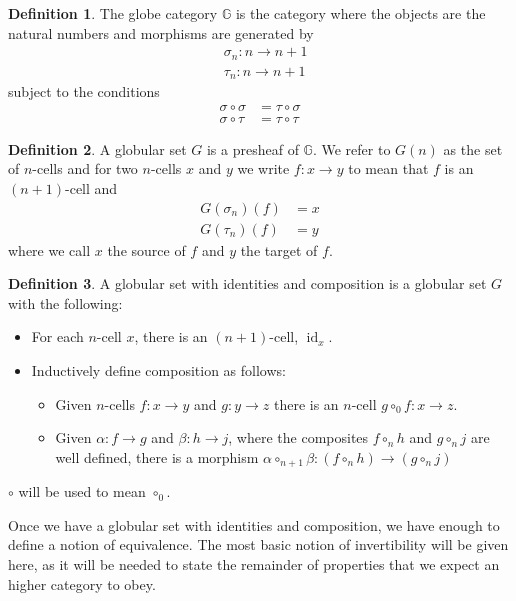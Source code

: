 \documentclass{article}
\theoremstyle{definition}
\newtheorem{definition}{Definition}
\theoremstyle{examplestyle}
\DeclareMathOperator{\id}{id}
\begin{document}
\begin{definition}
  The globe category \(\mathbb{G}\) is the category where the objects are the natural numbers and morphisms are generated by
  \begin{align*}
    &\sigma_n : n \to n+1\\
    &\tau_n : n \to n+1
  \end{align*}
  subject to the conditions
  \begin{align*}
    \sigma \circ \sigma &= \tau \circ \sigma\\
    \sigma \circ \tau &= \tau \circ \tau
  \end{align*}
\end{definition}

\begin{definition}
  A globular set \(G\) is a presheaf of \(\mathbb{G}\). We refer to \(G(n)\) as the set of \(n\)-cells and for two \(n\)-cells \(x\) and \(y\) we write \(f: x \to y\) to mean that \(f\) is an \((n+1)\)-cell and
  \begin{align*}
    G(\sigma_n)(f) &= x\\
    G(\tau_n)(f) &= y
  \end{align*}
  where we call \(x\) the source of \(f\) and \(y\) the target of \(f\).
\end{definition}

\begin{definition}
  A globular set with identities and composition is a globular set \(G\) with the following:
  \begin{itemize}
  \item For each \(n\)-cell \(x\), there is an \((n+1)\)-cell, \(\id_x\).
  \item Inductively define composition as follows:
    \begin{itemize}
    \item Given \(n\)-cells \(f: x \to y\) and \(g: y \to z\) there is
      an \(n\)-cell \(g \circ_0 f: x \to z\).
    \item Given \(\alpha: f \to g\) and \(\beta: h \to j\), where the composites \(f \circ_n h\) and \(g \circ_n j\) are well defined, there is a morphism \(\alpha \circ_{n+1} \beta: (f \circ_n h) \to (g \circ_n j)\)
    \end{itemize}
  \end{itemize}
  \(\circ\) will be used to mean \(\circ_0\).
\end{definition}

Once we have a globular set with identities and composition, we have enough to define a notion of equivalence. The most basic notion of invertibility will be given here, as it will be needed to state the remainder of properties that we expect an higher category to obey.
\end{document}

